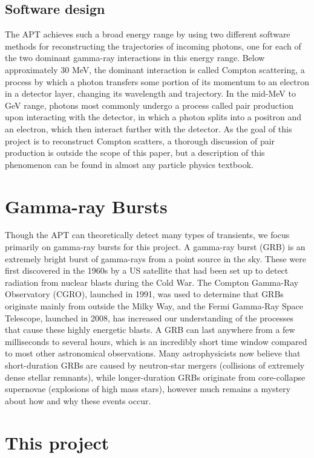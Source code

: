 \subsection{Software design}
The APT achieves such a broad energy range by using two different software methods for reconstructing the trajectories of incoming photons, one for each of the two dominant gamma-ray interactions in this energy range. Below approximately 30 MeV, the dominant interaction is called Compton scattering, a process by which a photon transfers some portion of its momentum to an electron in a detector layer, changing its wavelength and trajectory. In the mid-MeV to GeV range, photons most commonly undergo a process called pair production upon interacting with the detector, in which a photon splits into a positron and an electron, which then interact further with the detector. As the goal of this project is to reconstruct Compton scatters, a thorough discussion of pair production is outside the scope of this paper, but a description of this phenomenon can be found in almost any particle physics textbook.

\section{Gamma-ray Bursts}
Though the APT can theoretically detect many types of transients, we focus primarily on gamma-ray bursts for this project. A gamma-ray burst (GRB) is an extremely bright burst of gamma-rays from a point source in the sky. These were first discovered in the 1960s by a US satellite that had been set up to detect radiation from nuclear blasts during the Cold War. The Compton Gamma-Ray Observatory (CGRO), launched in 1991, was used to determine that GRBs originate mainly from outside the Milky Way, and the Fermi Gamma-Ray Space Telescope, launched in 2008, has increased our understanding of the processes that cause these highly energetic blasts. A GRB can last anywhere from a few milliseconds to several hours, which is an incredibly short time window compared to most other astronomical observations. Many astrophysicists now believe that short-duration GRBs are caused by neutron-star mergers (collisions of extremely dense stellar remnants), while longer-duration GRBs originate from core-collapse supernovae (explosions of high mass stars), however much remains a mystery about how and why these events occur.

\section{This project}
